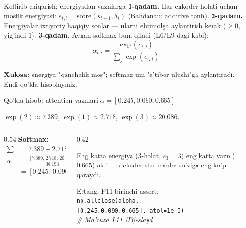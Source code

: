 \documentclass[aspectratio=169,11pt]{beamer}
\begin{document}
\begin{frame}{Keltirib chiqarish: energiyadan vaznlarga}
  \textbf{1-qadam.} Har enkoder holati uchun moslik energiyasi:
  $e_{t,i}=\text{score}(s_{t-1}, h_i)$ (Bahdanau: additive tanh).
  \pause
  \textbf{2-qadam.} Energiyalar ixtiyoriy haqiqiy sonlar --- ularni ehtimolga
  aylantirish kerak ($\ge 0$, yig'indi 1).
  \pause
  \textbf{3-qadam.} Aynan softmax buni qiladi (L6/L9 dagi kabi):
  $$ \alpha_{t,i} = \frac{\exp(e_{t,i})}{\sum_j \exp(e_{t,j})} $$
  \begin{tcolorbox}[okbox,top=2pt,bottom=2pt]
    \small \textbf{Xulosa:} energiya "qanchalik mos"; softmax uni "e'tibor ulushi"ga
    aylantiradi. Endi qo'lda hisoblaymiz.
  \end{tcolorbox}
\end{frame}

%
\begin{frame}{Qo'lda hisob: attention vaznlari $\alpha=[0.245, 0.090, 0.665]$}
  \begin{tcolorbox}[defbox,title={Energiyalar e=[2, 1, 3] (3 enkoder holati)}]
    \small $\exp(2)\approx 7.389$, \; $\exp(1)\approx 2.718$, \; $\exp(3)\approx 20.086$.
  \end{tcolorbox}
  \vspace{0.2em}
  \begin{columns}[T]
    \begin{column}{0.54\textwidth}
      \textbf{Softmax:}
      \begin{align*}
        \textstyle\sum &= 7.389 + 2.718 + 20.086 = 30.193\\
        \alpha &= \tfrac{[7.389,\, 2.718,\, 20.086]}{30.193}\\
          &= \mathbf{[0.245,\ 0.090,\ 0.665]}
      \end{align*}
    \end{column}
    \begin{column}{0.42\textwidth}
      \begin{tcolorbox}[okbox,top=2pt,bottom=2pt]
        \footnotesize
        Eng katta energiya (3-holat, $e_3{=}3$) eng katta vazn ($0.665$) oldi ---
        dekoder shu manba so'ziga eng ko'p qaraydi.
      \end{tcolorbox}
      \vspace{3pt}
      \footnotesize\color{halfgray}
      Ertangi P11 birinchi assert:\\
      \texttt{np.allclose(alpha,}\\
      \texttt{\phantom{xx}[0.245,0.090,0.665], atol=1e-3)}\\
      \textit{\# Ma'ruza L11 [I3]-slayd}
    \end{column}
  \end{columns}
\end{frame}
\end{document}
